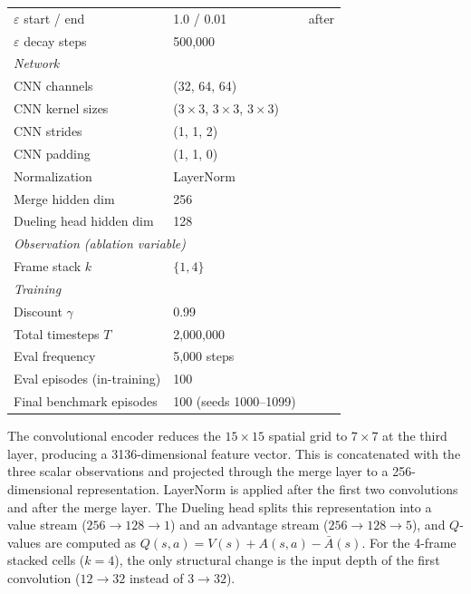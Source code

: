 \documentclass[12pt,a4paper,titlepage]{article}
\begin{document}
\begin{table}[!ht]
\begin{tabular}{lll}
$\varepsilon$ start / end  & 1.0 / 0.01        & after \citet{Mnih2015} \\
$\varepsilon$ decay steps  & 500{,}000         & \\
\midrule
\multicolumn{3}{l}{\textit{Network}} \\
CNN channels               & (32, 64, 64)      & \citet{Mnih2015} \\
CNN kernel sizes           & ($3{\times}3$, $3{\times}3$, $3{\times}3$) & \\
CNN strides                & (1, 1, 2)         & \\
CNN padding                & (1, 1, 0)         & \\
Normalization              & LayerNorm         & \citet{Ba2016} \\
Merge hidden dim           & 256               & \\
Dueling head hidden dim    & 128               & \\
\midrule
\multicolumn{3}{l}{\textit{Observation (ablation variable)}} \\
Frame stack $k$            & $\{1, 4\}$        & \citet{Mnih2015} \\
\midrule
\multicolumn{3}{l}{\textit{Training}} \\
Discount $\gamma$          & 0.99              & \\
Total timesteps $T$        & 2{,}000{,}000     & \\
Eval frequency             & 5{,}000 steps     & \\
Eval episodes (in-training) & 100               & \\
Final benchmark episodes   & 100 (seeds 1000--1099) & \\
\bottomrule
\end{tabular}
\end{table}

The convolutional encoder reduces the $15 \times 15$ spatial grid to $7 \times 7$ at the third layer, producing a 3136-dimensional feature vector. This is concatenated with the three scalar observations and projected through the merge layer to a 256-dimensional representation. LayerNorm is applied after the first two convolutions and after the merge layer. The Dueling head splits this representation into a value stream ($256 \to 128 \to 1$) and an advantage stream ($256 \to 128 \to 5$), and $Q$-values are computed as $Q(s, a) = V(s) + A(s, a) - \bar{A}(s)$. For the 4-frame stacked cells ($k = 4$), the only structural change is the input depth of the first convolution ($12 \to 32$ instead of $3 \to 32$).
\end{document}
